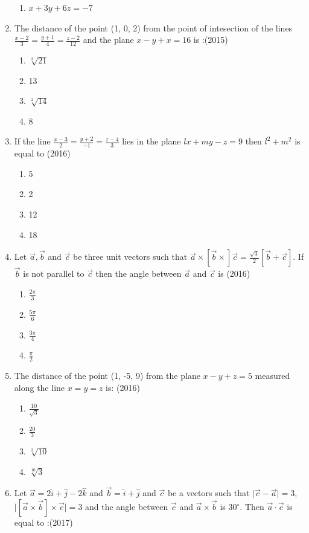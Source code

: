 \documentclass[12pt]{article}
\providecommand{\sbrak}[1]{\ensuremath{{}\left[#1\right]}}
\begin{document}
\begin{enumerate}
\begin{enumerate}
\item $x+3y+6z=-7$
\end{enumerate}
\item  The distance of the point (1, 0, 2) from the point of intesection of the lines $\frac{x-2}{3}=\frac{y+1}{4}=\frac{z-2}{12}$ and the plane $x-y+x=16$ is :(2015)
\begin{enumerate}
\item $\sqrt[3]{21}$
\item 13
\item $\sqrt[2]{14}$
\item 8
\end{enumerate}
\item If the line $\frac{x-3}{2}=\frac{y+2}{-1}=\frac{z-4}{3}$ lies in the plane $lx+my-z=9$ then $l^2+m^2$ is equal to (2016)
\begin{enumerate}
\item 5
\item 2
\item 12
\item 18
\end{enumerate}
\item  Let $\vec{a},\vec{b}$ and $\vec{c}$ be three unit vectors such that $\vec{a}\times\sbrak{\vec{b}\times}\vec{c}=\frac{\sqrt{3}}{2}\sbrak{\vec{b}+\vec{c}}$. If $\vec{b}$ is not parallel to $\vec{c}$ then the angle between $\vec{a}$ and $\vec{c}$ is (2016)
\begin{enumerate}
\item $\frac{2\pi}{3}$
\item $\frac{5\pi}{6}$
\item $\frac{3\pi}{4}$
\item $\frac{\pi}{2}$
\end{enumerate}
\item The distance of the point (1, -5, 9) from the plane $x-y+z=5$ measured along the line $x =y=z$ is: (2016)
\begin{enumerate}
\item  $\frac{10}{\sqrt{3}}$
\item $\frac{20}{3}$
\item $\sqrt[3]{10}$
\item $\sqrt[10]{3}$
\end{enumerate}
\item  Let $\vec{a}=2\hat{i}+\hat{j}-2\hat{k}$ and $\vec{b}=\hat{i}+\hat{j}$ and $\vec{c}$ be a vectors such that $\mid \vec{c}-\vec{a} \mid =3$,$\mid \sbrak{\vec{a}\times\vec{b}}\times \vec{c}\mid=3$ and the angle between $\vec{c}$ and $\vec{a}\times\vec{b}$ is $30^\circ$. Then $\vec{a}\cdot\vec{c}$ is equal to :(2017)

\end{enumerate}
\end{document}
